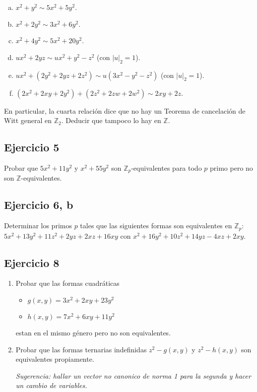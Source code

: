 \documentclass[12pt]{amsart}
\newcommand{\ZZ}{\mathbb{Z}}
\theoremstyle{plain}
\begin{document}
\begin{enumerate}[a)]
    \item $x^2+y^2\sim 5x^2+5y^2$.
    \item $x^2+2y^2\sim 3x^2+6y^2$.
    \item $x^2+4y^2\sim 5x^2+20y^2$.
    \item $ux^2+2yz\sim ux^2+y^2-z^2$ (con $|u|_2=1$).
    \item $ux^2+(2y^2+2yz+2z^2)\sim u(3x^2-y^2-z^2)$ (con $|u|_2=1$).
    \item $(2x^2+2xy+2y^2)+(2z^2+2zw+2w^2)\sim 2xy+2z$.
\end{enumerate}

En particular, la cuarta relación dice que no hay un Teorema de 
cancelación de Witt general en $\ZZ_2$. Deducir que tampoco lo hay 
en $\ZZ$.

\subsection*{Ejercicio 5}

Probar que $5x^2 + 11y^2$ y $x^2+55y^2$ son $\ZZ_p$-equivalentes
para todo $p$ primo pero no son $\ZZ$-equivalentes.

\subsection*{Ejercicio 6, b}

Determinar los primos $p$ tales que las siguientes formas son
equivalentes en $\ZZ_p$: $5x^2 + 13y^2 + 11z^2 + 2yz + 2xz +
16xy$ con $x^2 + 16y^2 + 10z^2 + 14yz - 4xz + 2xy$.

\subsection*{Ejercicio 8}

\begin{enumerate}[1.]
\item Probar que las formas cuadráticas
    \begin{itemize}
        \item $g(x,y)=3x^2+2xy+23y^2$
        \item $h(x,y)=7x^2+6xy+11y^2$
    \end{itemize}
    estan en el mismo género pero no son equivalentes.
\item Probar que las formas ternarias indefinidas $z^2-g(x,y)$ y 
    $z^2-h(x,y)$ son equivalentes propiamente.

    \textit{Sugerencia: hallar un vector no canonico de norma 1 para 
    la segunda y hacer un cambio de variables.}
\end{enumerate}
\end{document}
